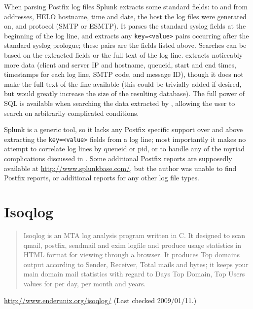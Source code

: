 When parsing Postfix log files Splunk extracts some standard fields: to and
from addresses, HELO hostname, time and date, the host the log files were
generated on, and protocol (\gls{SMTP} or \gls{ESMTP}).  It parses the
standard syslog fields at the beginning of the log line, and
extracts any \texttt{key=<value>} pairs occurring after the standard syslog
prologue; these pairs are the fields listed above.  Searches can be based
on the extracted fields or the full text of the log line.  \parsername{}
extracts noticeably more data (client and server \gls{IP} and hostname,
queueid, start and end times, timestamps for each log line, \gls{SMTP}
code, and message ID), though it does not make the full text of the line
available (this could be trivially added if desired, but would greatly
increase the size of the resulting database).  The full power of \gls{SQL}
is available when searching the data extracted by \parsername{}, allowing
the user to search on arbitrarily complicated conditions.

Splunk is a generic tool, so it lacks any Postfix specific support over and
above extracting the \texttt{key=<value>} fields from a log line; most
importantly it makes no attempt to correlate log lines by queueid or
\gls{pid}, or to handle any of the myriad complications discussed in
.  Some additional Postfix reports are supposedly
available at \url{http://www.splunkbase.com/}, but the author was unable to
find Postfix reports, or additional reports for any other log file types.

\section{Isoqlog}

\begin{quotation}

    Isoqlog is an MTA log analysis program written in C. It designed to
    scan qmail, postfix, sendmail and exim logfile and produce usage
    statistics in HTML format for viewing through a browser. It produces
    Top domains output according to Sender, Receiver, Total mails and
    bytes; it keeps your main domain mail statistics with regard to Days
    Top Domain, Top Users values for per day, per month and years.

\end{quotation}

\noindent{}\url{http://www.enderunix.org/isoqlog/} \newline{}
(Last checked 2009/01/11.)

